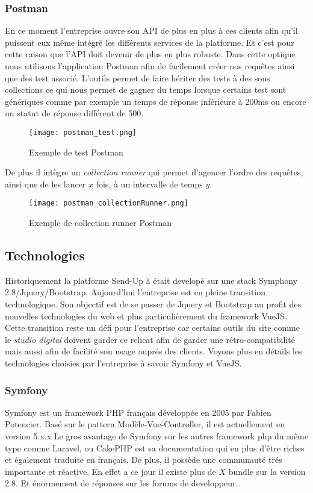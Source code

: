 \subsubsection{Postman}

En ce moment l'entreprise ouvre son API de plus en plus à ces clients afin qu'il puissent eux même intégré les différents services de la platforme. Et c'est pour cette raison que l'API doit devenir de plus en plus robuste. Dans cette optique nous utilisons l'application Postman afin de facilement créer nos requêtes ainsi que des test associé. L'outils permet de faire hériter des tests à des sous collections ce qui nous permet de gagner du temps lorsque certains test sont génériques comme par exemple un temps de réponse inférieure à 200ms ou encore un statut de réponse différent de 500. 

\begin{figure}[htbp]
    \center
        \texttt{[image: postman\_test.png]}
        \caption{Exemple de test Postman}
\end{figure}

De plus il intègre un \textit{collection runner} qui permet d'agencer l'ordre des requêtes, ainsi que de les lancer $x$ fois, à un intervalle de temps $y$. 

\begin{figure}[htbp]
    \center
    \texttt{[image: postman\_collectionRunner.png]}
    \caption{Exemple de collection runner Postman}
\end{figure}

\subsection{Technologies}

Historiquement la platforme Send-Up à était developé sur une stack Symphony 2.8/Jquery/Bootstrap. Aujourd'hui l'entreprise est en pleine transition technologique. Son objectif est de se passer de Jquery et Bootstrap au profit des nouvelles technologies du web et plus particulièrement du framework VueJS. Cette transition reste un défi pour l'entreprise car certains outils du site comme le \textit{studio digital} doivent garder ce relicat afin de garder une rétro-compatibilité mais aussi afin de facilité son usage auprés des clients. Voyons plus en détails les technologies choisies par l'entreprise à savoir Symfony et VueJS.

\subsubsection{Symfony}
Symfony est un framework PHP français développée en 2005 par Fabien Potencier. Basé sur le pattern Modèle-Vue-Controller, il est actuellement en version 5.x.x  Le gros avantage de Symfony sur les autres framework php du même type comme Laravel, ou CakePHP est sa documentation qui en plus d'être riches et également traduite en français. De plus, il possède une communauté trés importante et réactive. En effet a ce jour il existe plus de $X$ bundle sur la version 2.8. Et énormement de réponses sur les forums de developpeur.


